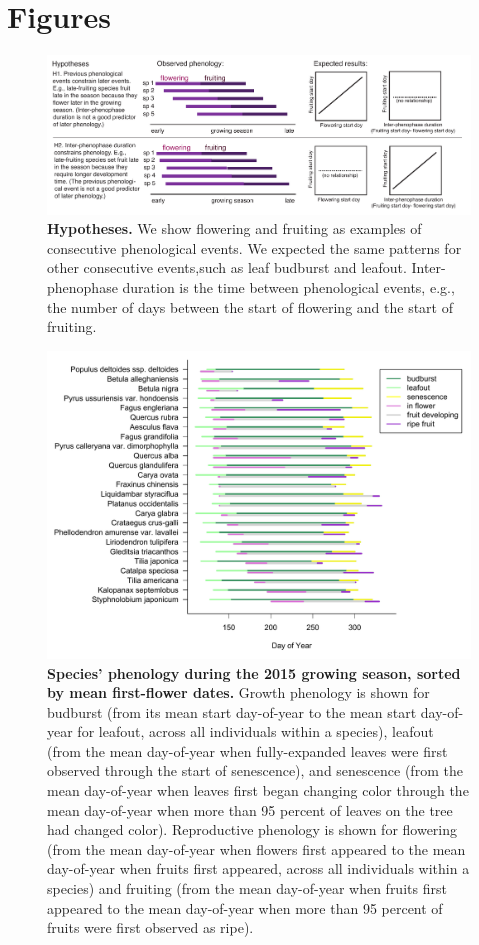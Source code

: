 \documentclass{article}
\begin{document}
\section* {Figures}
\begin{figure}[p]
  \centering
  \includegraphics{../analyses/figures/hypotheses3.pdf} 
  \caption{\textbf{Hypotheses.} We show flowering and fruiting as examples of consecutive phenological events. We expected the same patterns for other consecutive events,such as leaf budburst and leafout. Inter-phenophase duration is the time between phenological events, e.g., the number of days between the start of flowering and the start of fruiting.} 
 \label{fig:hyp}
\end{figure}
 
\begin{figure}[h]
  \centering
  \includegraphics{../analyses/figures/grosea_repsort_ripefruit_legend.pdf}
  \caption{\textbf{Species' phenology during the 2015 growing season, sorted by mean first-flower dates.} Growth phenology is shown for budburst (from its mean start day-of-year to the mean start day-of-year for leafout, across all individuals within a species), leafout (from the mean day-of-year when fully-expanded leaves were first observed through the start of senescence), and senescence (from the mean day-of-year when leaves first began changing color through the mean day-of-year when more than 95 percent of leaves on the tree had changed color). Reproductive phenology is shown for flowering (from the mean day-of-year when flowers first appeared to the mean day-of-year when fruits first appeared, across all individuals within a species) and fruiting (from the mean day-of-year when fruits first appeared to the mean day-of-year when more than 95 percent of fruits were first observed as ripe).}
  \label{fig:focsp}
\end{figure}
  
\end{document}

